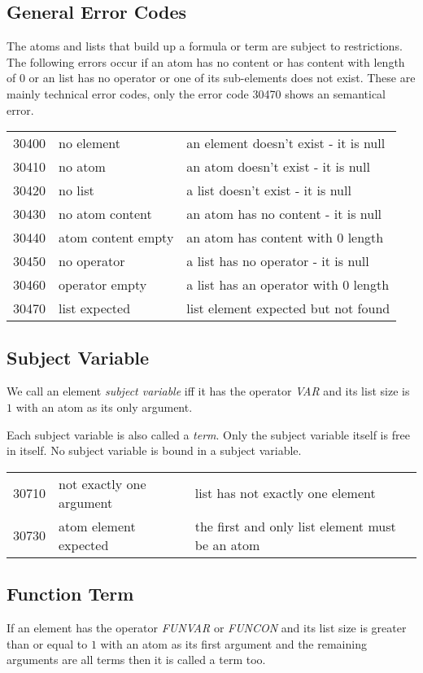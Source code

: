\documentclass[a4paper,german,10pt,twoside]{book}
\theoremstyle{definition}
\theoremstyle{remark}
\begin{document}
\subsection{General Error Codes
}
The atoms and lists that build up a formula or term are subject to restrictions.  The following errors occur if an atom has no content or has content with length of $0$ or an list has no operator or one of its sub-elements does not exist.
These are mainly technical error codes, only the error code 30470 shows an semantical error.

\begin{tabularx}{\linewidth}{llX}
  30400  & no element         & an element doesn't exist - it is null \\
  30410  & no atom            & an atom doesn't exist - it is null \\
  30420  & no list            & a list doesn't exist - it is null \\
  30430  & no atom content    & an atom has no content - it is null \\
  30440  & atom content empty & an atom has content with $0$ length \\
  30450  & no operator        & a list has no operator - it is null \\
  30460  & operator empty     & a list has an operator with $0$ length \\
  30470  & list expected      & list element expected but not found
\end{tabularx}


\subsection{Subject Variable
}
We call an element \emph{subject variable} iff it has the operator \emph{VAR} and its list size is $1$ with an atom as its only argument.

\par
Each subject variable is also called a \emph{term}. Only the subject variable itself is free in itself. No subject variable is bound in a subject variable.

\begin{tabularx}{\linewidth}{llX}
  30710  & not exactly one argument & list has not exactly one element \\
  30730  & atom element expected    & the first and only list element must be an atom 
\end{tabularx}


\subsection{Function Term
}
If an element has the operator \emph{FUNVAR} or \emph{FUNCON} and its list size is greater than or equal to $1$ with an atom as its first argument and the remaining arguments are all terms then it is called a term too.
\end{document}
